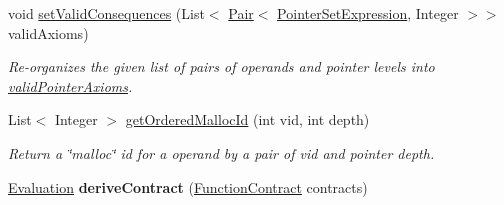 \begin{DoxyCompactItemize}
\item 
void \hyperlink{classedu_1_1udel_1_1cis_1_1vsl_1_1civl_1_1semantics_1_1contract_1_1CommonContractConditionGenerator_a9088f0200204ccc99c33475b3542e028}{set\+Valid\+Consequences} (List$<$ \hyperlink{classedu_1_1udel_1_1cis_1_1vsl_1_1civl_1_1util_1_1IF_1_1Pair}{Pair}$<$ \hyperlink{interfaceedu_1_1udel_1_1cis_1_1vsl_1_1civl_1_1model_1_1IF_1_1expression_1_1PointerSetExpression}{Pointer\+Set\+Expression}, Integer $>$$>$ valid\+Axioms)
\begin{DoxyCompactList}\small\item\em Re-\/organizes the given list of pairs of  operands and pointer levels into \hyperlink{}{valid\+Pointer\+Axioms}. \end{DoxyCompactList}\item 
List$<$ Integer $>$ \hyperlink{classedu_1_1udel_1_1cis_1_1vsl_1_1civl_1_1semantics_1_1contract_1_1CommonContractConditionGenerator_a7c02d846db29d5aab24bb54af7eda389}{get\+Ordered\+Malloc\+Id} (int vid, int depth)
\begin{DoxyCompactList}\small\item\em Return a \char`\"{}malloc\char`\"{} id for a  operand by a pair of vid and pointer depth. \end{DoxyCompactList}\item 
\hypertarget{classedu_1_1udel_1_1cis_1_1vsl_1_1civl_1_1semantics_1_1contract_1_1CommonContractConditionGenerator_ad2a64900b9a497600d417fba4866af0d}{}\hyperlink{classedu_1_1udel_1_1cis_1_1vsl_1_1civl_1_1semantics_1_1IF_1_1Evaluation}{Evaluation} {\bfseries derive\+Contract} (\hyperlink{interfaceedu_1_1udel_1_1cis_1_1vsl_1_1civl_1_1model_1_1IF_1_1contract_1_1FunctionContract}{Function\+Contract} contracts)\label{classedu_1_1udel_1_1cis_1_1vsl_1_1civl_1_1semantics_1_1contract_1_1CommonContractConditionGenerator_ad2a64900b9a497600d417fba4866af0d}


\end{DoxyCompactItemize}
